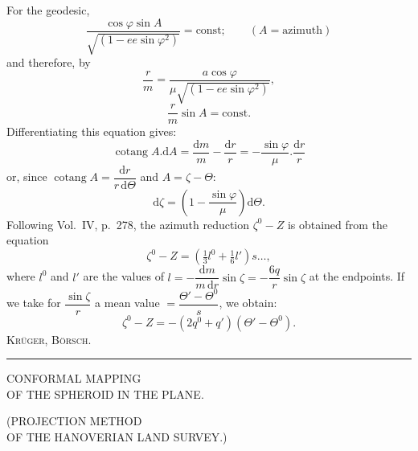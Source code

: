 For the geodesic,
\[
\frac{\cos\varphi\sin A}{\sqrt{(1-ee\sin\varphi^2)}}=\text{const};\qquad(A=\text{azimuth})
\]
and therefore, by
\[
\frac rm=\frac{a\cos\varphi}{\mu\sqrt{(1-ee\sin\varphi^2)}},
\]
\[
\frac rm\sin A=\text{const.}
\]
Differentiating this equation gives:
\[
\operatorname{cotang}A.\mathrm dA=\frac{\mathrm dm}{m}-\frac{\mathrm dr}{r}=-\frac{\sin\varphi}{\mu}.\frac{\mathrm dr}{r}
\]
or, since $\operatorname{cotang}A=\dfrac{\mathrm dr}{r\,\mathrm d\Theta}$ and $A=\zeta-\Theta$:
\[
\mathrm d\zeta=\left(1-\frac{\sin\varphi}{\mu}\right)\mathrm d\Theta.
\]
Following Vol.~IV, p.~278, the azimuth reduction $\zeta^0-Z$ is obtained from the equation
\[
\zeta^0-Z=(\tfrac13l^0+\tfrac16l')s\ldots,
\]
where $l^0$ and $l'$ are the values of $l=-\dfrac{\mathrm dm}{m\,\mathrm dr}\sin\zeta=-\dfrac{6q}{r}\sin\zeta$ at the endpoints. If we take for $\dfrac{\sin\zeta}{r}$ a mean value $=\dfrac{\Theta'-\Theta^0}{s}$, we obtain:
\[
\zeta^0-Z=-(2q^0+q')(\Theta'-\Theta^0).
\]
\hfill\textsc{Krüger, Börsch.}\par
\par\endgroup
\vfill\begin{center}\rule{.24\textwidth}{.4pt}\end{center}
\clearpage
\null\vfill
\begin{center}
{\LARGE CONFORMAL MAPPING\\[8pt]OF THE SPHEROID IN THE PLANE.}\par\bigskip
{\Large (PROJECTION METHOD\\OF THE HANOVERIAN LAND SURVEY.)}
\end{center}
\vfill\null
\endgroup
